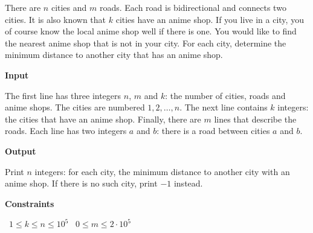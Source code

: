 There are $n$ cities and $m$ roads. Each road is bidirectional and connects two cities. It is also known that $k$ cities have an anime shop.
If you live in a city, you of course know the local anime shop well if there is one. You would like to find the nearest anime shop that is not in your city.
For each city, determine the minimum distance to another city that has an anime shop.

\vspace{0.3cm}\noindent\textbf{Input}

The first line has three integers $n$, $m$ and $k$: the number of cities, roads and anime shops. The cities are numbered $1,2,\dots,n$.
The next line contains $k$ integers: the cities that have an anime shop.
Finally, there are $m$ lines that describe the roads. Each line has two integers $a$ and $b$: there is a road between cities $a$ and $b$.

\vspace{0.3cm}\noindent\textbf{Output}

Print $n$ integers: for each city, the minimum distance to another city with an anime shop. If there is no such city, print $-1$ instead.

\vspace{0.3cm}\noindent\textbf{Constraints}

\textbullet\ $1 \le k \le n \le 10^5$
\textbullet\ $0 \le m \le 2 \cdot 10^5$